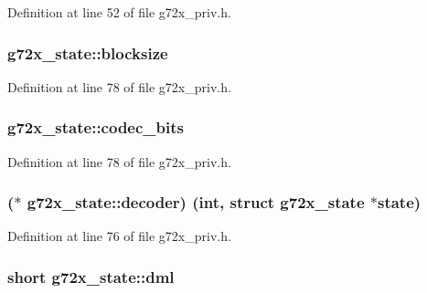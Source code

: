 Definition at line 52 of file g72x\+\_\+priv.\+h.

\subsubsection[{\texorpdfstring{blocksize}{blocksize}}]{ g72x\+\_\+state\+::blocksize}\hypertarget{structg72x__state_a12e0b1aa82fa4032c66def7b9434a0f5}{}\label{structg72x__state_a12e0b1aa82fa4032c66def7b9434a0f5}


Definition at line 78 of file g72x\+\_\+priv.\+h.

\subsubsection[{\texorpdfstring{codec\+\_\+bits}{codec_bits}}]{ g72x\+\_\+state\+::codec\+\_\+bits}\hypertarget{structg72x__state_ac1cf11976cf5e5de26f1b729b414e8ef}{}\label{structg72x__state_ac1cf11976cf5e5de26f1b729b414e8ef}


Definition at line 78 of file g72x\+\_\+priv.\+h.

\subsubsection[{\texorpdfstring{decoder}{decoder}}]{($\ast$ g72x\+\_\+state\+::decoder) ({\bf int}, struct {\bf g72x\+\_\+state} $\ast$state)}\hypertarget{structg72x__state_a803587e10ca7c86d52eafc2cc81fce04}{}\label{structg72x__state_a803587e10ca7c86d52eafc2cc81fce04}


Definition at line 76 of file g72x\+\_\+priv.\+h.

\subsubsection[{\texorpdfstring{dml}{dml}}]{\setlength{\rightskip}{0pt plus 5cm}short g72x\+\_\+state\+::dml}\hypertarget{structg72x__state_adbb9567904fa064d33382ef21d9001e8}{}\label{structg72x__state_adbb9567904fa064d33382ef21d9001e8}


